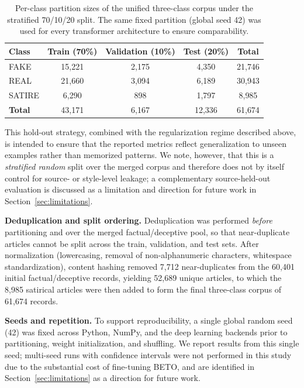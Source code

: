 \documentclass[informatics,article,submit,pdftex,moreauthors]{Definitions/mdpi}
\begin{document}
\begin{table}[H]
\centering
\caption{Per-class partition sizes of the unified three-class corpus under the stratified 70/10/20 split. The same fixed partition (global seed 42) was used for every transformer architecture to ensure comparability.}
\label{tab:split_sizes}
\begin{tabular}{lcccc}
\toprule
\textbf{Class} & \textbf{Train (70\%)} & \textbf{Validation (10\%)} & \textbf{Test (20\%)} & \textbf{Total} \\
\midrule
FAKE   & 15{,}221 & 2{,}175 & 4{,}350 & 21{,}746 \\
REAL   & 21{,}660 & 3{,}094 & 6{,}189 & 30{,}943 \\
SATIRE & 6{,}290  & 898    & 1{,}797 & 8{,}985  \\
\midrule
\textbf{Total} & 43{,}171 & 6{,}167 & 12{,}336 & 61{,}674 \\
\bottomrule
\end{tabular}
\end{table}

This hold-out strategy, combined with the regularization regime described above, is intended to ensure that the reported metrics reflect generalization to unseen examples rather than memorized patterns. We note, however, that this is a \emph{stratified random} split over the merged corpus and therefore does not by itself control for source- or style-level leakage; a complementary source-held-out evaluation is discussed as a limitation and direction for future work in Section~\ref{sec:limitations}.

\textbf{Deduplication and split ordering.} Deduplication was performed \emph{before} partitioning and over the merged factual/deceptive pool, so that near-duplicate articles cannot be split across the train, validation, and test sets. After normalization (lowercasing, removal of non-alphanumeric characters, whitespace standardization), content hashing removed 7{,}712 near-duplicates from the 60{,}401 initial factual/deceptive records, yielding 52{,}689 unique articles, to which the 8{,}985 satirical articles were then added to form the final three-class corpus of 61{,}674 records.

\textbf{Seeds and repetition.} To support reproducibility, a single global random seed (42) was fixed across Python, NumPy, and the deep learning backends prior to partitioning, weight initialization, and shuffling. We report results from this single seed; multi-seed runs with confidence intervals were not performed in this study due to the substantial cost of fine-tuning BETO, and are identified in Section~\ref{sec:limitations} as a direction for future work.
\end{document}
